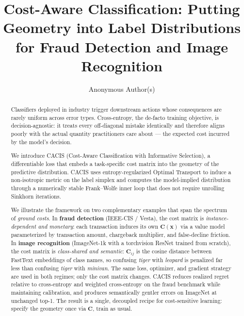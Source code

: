 \documentclass[sigconf,anonymous]{acmart}
\newcommand{\CACIS}{\textsc{CACIS}}
\newcommand{\vx}{\mathbf{x}}
\newcommand{\mC}{\mathbf{C}}
\begin{document}
\title{Cost-Aware Classification: Putting Geometry into Label Distributions for Fraud Detection and Image Recognition}

\author{Anonymous Author(s)}

\begin{abstract}
Classifiers deployed in industry trigger downstream actions whose consequences are rarely uniform across error types. Cross-entropy, the de-facto training objective, is decision-agnostic: it treats every off-diagonal mistake identically and therefore aligns poorly with the actual quantity practitioners care about --- the expected cost incurred by the model's decision.

We introduce \CACIS{} (Cost-Aware Classification with Informative Selection), a differentiable loss that embeds a task-specific cost matrix into the geometry of the predictive distribution. \CACIS{} uses entropy-regularized Optimal Transport to induce a non-isotropic metric on the label simplex and computes the model-implied distribution through a numerically stable Frank--Wolfe inner loop that does not require unrolling Sinkhorn iterations.

We illustrate the framework on two complementary examples that span the spectrum of \emph{ground costs}. In \textbf{fraud detection} (IEEE-CIS / Vesta), the cost matrix is \emph{instance-dependent and monetary}: each transaction induces its own $\mC(\vx)$ via a value model parameterized by transaction amount, chargeback multiplier, and false-decline friction. In \textbf{image recognition} (ImageNet-1k with a torchvision ResNet trained from scratch), the cost matrix is \emph{class-shared and semantic}: $\mC_{ij}$ is the cosine distance between FastText embeddings of class names, so confusing \emph{tiger} with \emph{leopard} is penalized far less than confusing \emph{tiger} with \emph{minivan}. The same loss, optimizer, and gradient strategy are used in both regimes; only the cost matrix changes. \CACIS{} reduces realized regret relative to cross-entropy and weighted cross-entropy on the fraud benchmark while maintaining calibration, and produces semantically gentler errors on ImageNet at unchanged top-1. The result is a single, decoupled recipe for cost-sensitive learning: specify the geometry once via $\mC$, train as usual.
\end{abstract}

\maketitle
\end{document}
